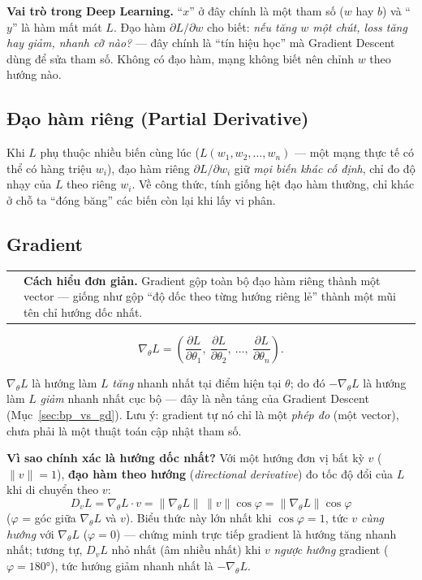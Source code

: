 \documentclass[12pt,a4paper]{article}
\makeatletter
\newenvironment{tructiep}[1][Cách hiểu đơn giản]
  {\par\smallskip\noindent\begin{tabular}{@{}p{0.35em}@{\hspace{6pt}}p{\dimexpr\linewidth-1.9em\relax}@{}}
   \textcolor{boxln}{\rule{2pt}{\baselineskip}} & \textbf{#1.}\enspace\ignorespaces}
  {\end{tabular}\par\smallskip}
\newcommand{\en}[1]{\textit{#1}}
\makeatother
\begin{document}
\textbf{Vai trò trong Deep Learning.} ``$x$'' ở đây chính là một tham số
($w$ hay $b$) và ``$y$'' là hàm mất mát $L$. Đạo hàm $\partial L/\partial w$
cho biết: \emph{nếu tăng $w$ một chút, loss tăng hay giảm, nhanh cỡ nào?}
--- đây chính là ``tín hiệu học'' mà Gradient Descent dùng để sửa tham số.
Không có đạo hàm, mạng không biết nên chỉnh $w$ theo hướng nào.

\subsection{Đạo hàm riêng (Partial Derivative)}

Khi $L$ phụ thuộc nhiều biến cùng lúc ($L(w_1,w_2,\ldots,w_n)$ --- một
mạng thực tế có thể có hàng triệu $w_i$), đạo hàm riêng
$\partial L/\partial w_i$ giữ \emph{mọi biến khác cố định}, chỉ đo độ nhạy
của $L$ theo riêng $w_i$. Về công thức, tính giống hệt đạo hàm thường, chỉ
khác ở chỗ ta ``đóng băng'' các biến còn lại khi lấy vi phân.

\subsection{Gradient}

\begin{tructiep}
Gradient gộp toàn bộ đạo hàm riêng thành một vector --- giống như gộp ``độ
dốc theo từng hướng riêng lẻ'' thành một mũi tên chỉ hướng dốc nhất.
\end{tructiep}

$$\nabla_\theta L = \left(\frac{\partial L}{\partial\theta_1},\ \frac{\partial L}{\partial\theta_2},\ \ldots,\ \frac{\partial L}{\partial\theta_n}\right).$$

$\nabla_\theta L$ là hướng làm $L$ \emph{tăng} nhanh nhất tại điểm hiện tại
$\theta$; do đó $-\nabla_\theta L$ là hướng làm $L$ \emph{giảm} nhanh nhất
cục bộ --- đây là nền tảng của Gradient Descent (Mục~\ref{sec:bp_vs_gd}).
Lưu ý: gradient tự nó chỉ là một \emph{phép đo} (một vector), chưa phải là
một thuật toán cập nhật tham số.

\textbf{Vì sao chính xác là hướng dốc nhất?} Với một hướng đơn vị bất kỳ
$v$ ($\lVert v\rVert=1$), \textbf{đạo hàm theo hướng} (\en{directional
derivative}) đo tốc độ đổi của $L$ khi di chuyển theo $v$:
$$D_v L = \nabla_\theta L \cdot v = \lVert\nabla_\theta L\rVert\,\lVert v\rVert\cos\varphi = \lVert\nabla_\theta L\rVert\cos\varphi$$
($\varphi$ = góc giữa $\nabla_\theta L$ và $v$). Biểu thức này lớn nhất
khi $\cos\varphi=1$, tức $v$ \emph{cùng hướng} với $\nabla_\theta L$
($\varphi=0$) --- chứng minh trực tiếp gradient là hướng tăng nhanh nhất;
tương tự, $D_vL$ nhỏ nhất (âm nhiều nhất) khi $v$ \emph{ngược hướng}
gradient ($\varphi=180°$), tức hướng giảm nhanh nhất là $-\nabla_\theta L$.
\end{document}
